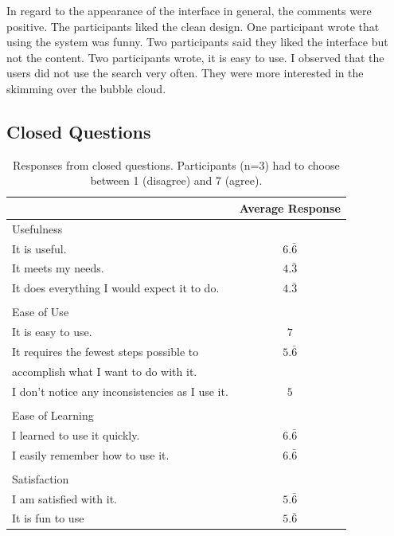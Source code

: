 \documentclass[11pt]{report}
\begin{document}
In regard to the appearance of the interface in general, the comments were positive. The participants liked the clean design. One participant wrote that using the system was funny. Two participants said they liked the interface but not the content. Two participants wrote, it is easy to use. I observed that the users did not use the search very often. They were more interested in the skimming over the bubble cloud.

\subsection{Closed Questions}

\begin{table}[h]
\caption{Responses from closed questions. Participants (n=3) had to choose between 1 (disagree) and 7 (agree). }
\label{table:closed}
\centering

\def\arraystretch{1.2}%
\begin{tabular}{ | l | c |}
\hline
& Average Response\\
\hline
\large{Usefulness}&\\
It is useful.&$6.\bar{6}$\\
It meets my needs.&$4.\bar{3}$\\
It does everything I would expect it to do.&$4.\bar{3}$\\
&\\
\large{Ease of Use}&\\
It is easy to use.&$7$\\
It requires the fewest steps possible to&$5.\bar{6}$\\
accomplish what I want to do with it.&\\
I don't notice any inconsistencies as I use it.&$5$\\
&\\
\large{Ease of Learning}&\\
I learned to use it quickly.&$6.\bar{6}$\\
I easily remember how to use it.&$6.\bar{6}$\\
&\\
\large{Satisfaction}&\\
I am satisfied with it.&$5.\bar{6}$\\
It is fun to use&$5.\bar{6}$\\

\hline

\end{tabular}
\end{table}
\end{document}
